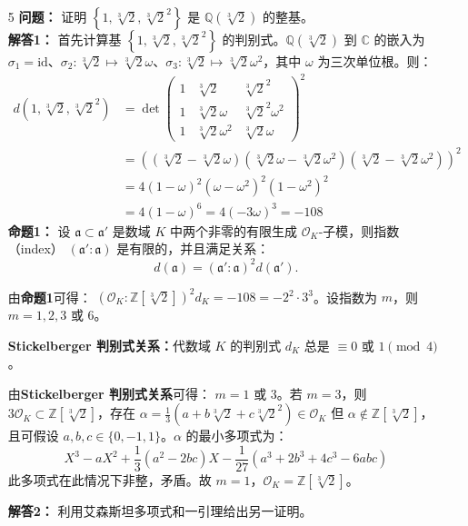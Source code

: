 \documentclass[UTF8]{ctexart}
\begin{document}
\begin{enumerate}
\item[5] 
\textbf{问题：} 证明 \(\left\{1, \sqrt[3]{2}, \sqrt[3]{2}^2\right\}\) 是 \(\mathbb{Q}(\sqrt[3]{2})\) 的整基。\\
\textbf{解答1：} 首先计算基 \(\left\{1, \sqrt[3]{2}, \sqrt[3]{2}^2\right\}\) 的判别式。\(\mathbb{Q}(\sqrt[3]{2})\) 到 \(\mathbb{C}\) 的嵌入为 \(\sigma_1 = \text{id}\)、\(\sigma_2: \sqrt[3]{2} \mapsto \sqrt[3]{2} \omega\)、\(\sigma_3: \sqrt[3]{2} \mapsto \sqrt[3]{2} \omega^2\)，其中 \(\omega\) 为三次单位根。则：
\[
\begin{aligned}
d\left(1, \sqrt[3]{2}, \sqrt[3]{2}^2\right) &= \det\begin{pmatrix}
1 & \sqrt[3]{2} & \sqrt[3]{2}^2 \\
1 & \sqrt[3]{2} \omega & \sqrt[3]{2}^2 \omega^2 \\
1 & \sqrt[3]{2} \omega^2 & \sqrt[3]{2} \omega
\end{pmatrix}^2 \\
&= \left( (\sqrt[3]{2} - \sqrt[3]{2} \omega)(\sqrt[3]{2} \omega - \sqrt[3]{2} \omega^2)(\sqrt[3]{2} - \sqrt[3]{2} \omega^2) \right)^2 \\
&= 4 (1 - \omega)^2 (\omega - \omega^2)^2 (1 - \omega^2)^2 \\
&= 4 (1 - \omega)^6 = 4 (-3 \omega)^3 = -108
\end{aligned}
\]
\textbf{命题1：} 设 \(\mathfrak{a} \subset \mathfrak{a}' \) 是数域 \( K \) 中两个非零的有限生成 \(\mathcal{O}_K\)-子模，则指数（index） \( (\mathfrak{a}' : \mathfrak{a}) \) 是有限的，并且满足关系：
\[
d(\mathfrak{a}) = (\mathfrak{a}' : \mathfrak{a})^2 d(\mathfrak{a}').
\]

由\textbf{命题1}可得：
\(\left(\mathcal{O}_K : \mathbb{Z}[\sqrt[3]{2}]\right)^2 d_K = -108 = -2^2 \cdot 3^3\)。设指数为 \(m\)，则 \(m = 1, 2, 3\) 或 6。

\textbf{Stickelberger 判别式关系：}代数域 \(K\) 的判别式 \(d_K\) 总是 \(\equiv 0 \text{ 或 } 1 \pmod{4}\)。

由\textbf{Stickelberger 判别式关系}可得：
\(m = 1\) 或 3。若 \(m = 3\)，则 \(3 \mathcal{O}_K \subset \mathbb{Z}[\sqrt[3]{2}]\)，存在 \(\alpha = \frac{1}{3}(a + b \sqrt[3]{2} + c \sqrt[3]{2}^2) \in \mathcal{O}_K\) 但 \(\alpha \notin \mathbb{Z}[\sqrt[3]{2}]\)，且可假设 \(a, b, c \in \{0, -1, 1\}\)。\(\alpha\) 的最小多项式为：
\[
X^3 - a X^2 + \frac{1}{3}(a^2 - 2bc) X - \frac{1}{27}(a^3 + 2b^3 + 4c^3 - 6abc)
\]
此多项式在此情况下非整，矛盾。故 \(m = 1\)，\(\mathcal{O}_K = \mathbb{Z}[\sqrt[3]{2}]\)。  

\textbf{解答2：}
利用艾森斯坦多项式和一引理给出另一证明。


\end{enumerate}
\end{document}
